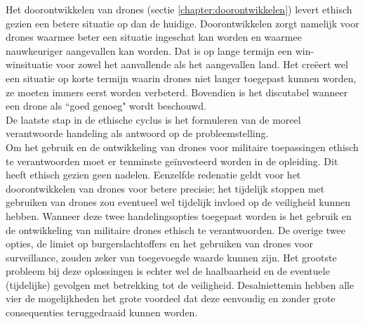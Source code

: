 Het doorontwikkelen van drones (sectie \ref{chapter:doorontwikkelen}) levert ethisch gezien een betere situatie op dan de huidige. Doorontwikkelen zorgt namelijk voor drones waarmee beter een situatie ingeschat kan worden en waarmee nauwkeuriger aangevallen kan worden. Dat is op lange termijn een win-winsituatie voor zowel het aanvallende als het aangevallen land. Het cre\"eert wel een situatie op korte termijn waarin drones niet langer toegepast kunnen worden, ze moeten immers eerst worden verbeterd. Bovendien is het discutabel wanneer een drone als ``goed genoeg" wordt beschouwd.\\

De laatste stap in de ethische cyclus is het formuleren van de moreel verantwoorde handeling als antwoord op de probleemstelling. \\
Om het gebruik en de ontwikkeling van drones voor militaire toepassingen ethisch te verantwoorden moet er tenminste ge\"investeerd worden in de opleiding. Dit heeft ethisch gezien geen nadelen. Eenzelfde redenatie geldt voor het doorontwikkelen van drones voor betere precisie; het tijdelijk stoppen met gebruiken van drones zou eventueel wel tijdelijk invloed op de veiligheid kunnen hebben.
Wanneer deze twee handelingsopties toegepast worden is het gebruik en de ontwikkeling van militaire drones ethisch te verantwoorden. De overige twee opties, de limiet op burgerslachtoffers en het gebruiken van drones voor surveillance, zouden zeker van toegevoegde waarde kunnen zijn. Het grootste probleem bij deze oplossingen is echter wel de haalbaarheid en de eventuele (tijdelijke) gevolgen met betrekking tot de veiligheid. Desalniettemin hebben alle vier de mogelijkheden het grote voordeel dat deze eenvoudig en zonder grote consequenties teruggedraaid kunnen worden.\\